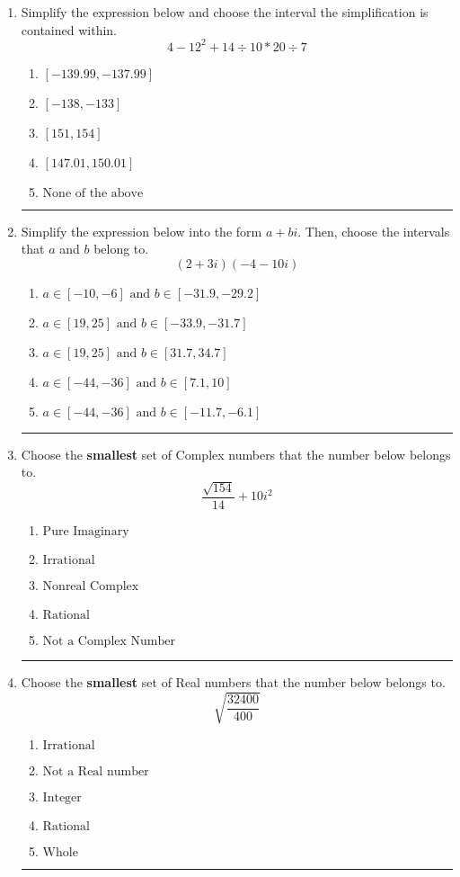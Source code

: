 \documentclass[14pt]{extbook}
\newcommand{\litem}[1]{\item#1\hspace*{-1cm}\rule{\textwidth}{0.4pt}}
\begin{document}
\begin{enumerate}
\litem{
Simplify the expression below and choose the interval the simplification is contained within.\[ 4 - 12^2 + 14 \div 10 * 20 \div 7 \]\begin{enumerate}[label=\Alph*.]
\item \( [-139.99, -137.99] \)
\item \( [-138, -133] \)
\item \( [151, 154] \)
\item \( [147.01, 150.01] \)
\item \( \text{None of the above} \)

\end{enumerate} }
\litem{
Simplify the expression below into the form $a+bi$. Then, choose the intervals that $a$ and $b$ belong to.\[ (2 + 3 i)(-4 - 10 i) \]\begin{enumerate}[label=\Alph*.]
\item \( a \in [-10, -6] \text{ and } b \in [-31.9, -29.2] \)
\item \( a \in [19, 25] \text{ and } b \in [-33.9, -31.7] \)
\item \( a \in [19, 25] \text{ and } b \in [31.7, 34.7] \)
\item \( a \in [-44, -36] \text{ and } b \in [7.1, 10] \)
\item \( a \in [-44, -36] \text{ and } b \in [-11.7, -6.1] \)

\end{enumerate} }
\litem{
Choose the \textbf{smallest} set of Complex numbers that the number below belongs to.\[ \frac{\sqrt{154}}{14}+10i^2 \]\begin{enumerate}[label=\Alph*.]
\item \( \text{Pure Imaginary} \)
\item \( \text{Irrational} \)
\item \( \text{Nonreal Complex} \)
\item \( \text{Rational} \)
\item \( \text{Not a Complex Number} \)

\end{enumerate} }
\litem{
Choose the \textbf{smallest} set of Real numbers that the number below belongs to.\[ \sqrt{\frac{32400}{400}} \]\begin{enumerate}[label=\Alph*.]
\item \( \text{Irrational} \)
\item \( \text{Not a Real number} \)
\item \( \text{Integer} \)
\item \( \text{Rational} \)
\item \( \text{Whole} \)


\end{enumerate}}
\end{enumerate}
\end{document}
